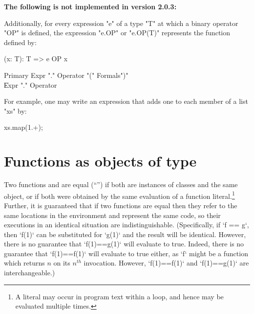 \begin{planned}

{\bf The following is not implemented in version 2.0.3:}

Additionally, for every expression \xcd"e" of a type \xcd"T" at which a binary
operator \xcd"OP" is defined, the expression \xcd"e.OP" or
\xcd"e.OP(T)" represents the function
defined by:

\begin{xten}
(x: T): T => { e OP x }
\end{xten}

\begin{grammar}
Primary \: Expr \xcd"." Operator \xcd"(" Formals\opt \xcd")" \\
        \| Expr \xcd"." Operator \\
\end{grammar}



For example,
one may write an expression that adds one to each member of a
list \xcd"xs" by:

\begin{xten}
xs.map(1.+);
\end{xten}
%
\end{planned}


\section{Functions as objects of type }
\label{FunctionAnyMethods}

\label{FunctionEquality}
  Two functions  and
 are equal (``\Xcd{==}'') if both are instances of classes and the same
object, or if both were obtained by the same evaluation of a function
literal.\footnote{A literal may occur in program text within a loop, and hence
  may be evaluated multiple times.} Further, it is guaranteed that if two
functions are equal then they refer to the same locations in the environment
and represent the same code, so their executions in an identical situation are
indistinguishable. (Specifically, if \xcd`f == g`, then \xcd`f(1)` can be
substituted for \xcd`g(1)` and the result will be identical. However, there is
no guarantee that \xcd`f(1)==g(1)` will evaluate to true. Indeed, there is no
guarantee that \xcd`f(1)==f(1)` will evaluate to true either, as \xcd`f` might
be a function which returns {$n$} on its {$n^{th}$} invocation. However,
\xcd`f(1)==f(1)` and \xcd`f(1)==g(1)` are interchangeable.)


